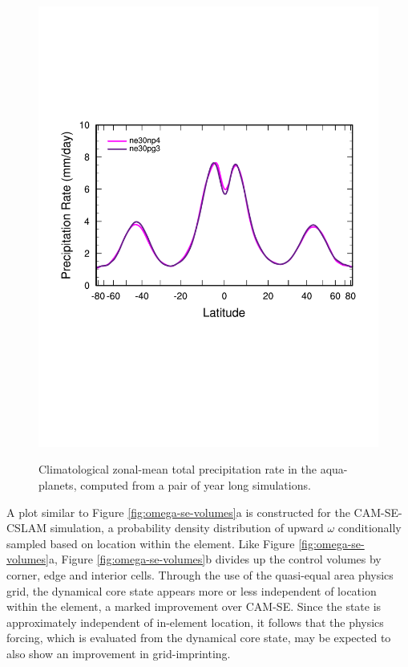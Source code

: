 \documentclass[twocol]{ametsoc}
\begin{document}
\begin{figure}[t]
\begin{center}
\noindent\includegraphics[width=37pc,angle=0]{figs/temp_dzonal.pdf}\\
\end{center}
\caption{Climatological zonal-mean total precipitation rate in the aqua-planets, computed from a pair of year long simulations.}
\label{fig:zonal}
\end{figure}

A plot similar to Figure \ref{fig:omega-se-volumes}a is constructed for the CAM-SE-CSLAM simulation, a probability density distribution of upward $\omega$ conditionally sampled based on location within the element. {\color{red}Like Figure \ref{fig:omega-se-volumes}a, Figure \ref{fig:omega-se-volumes}b divides up the control volumes by corner, edge and interior cells. Through the use of the quasi-equal area physics grid, the dynamical core state appears more or less independent of location within the element, a marked improvement over CAM-SE. Since the state is approximately independent of in-element location, it follows that the physics forcing, which is evaluated from the dynamical core state, may be expected to also show an improvement in grid-imprinting.{}} 
\end{document}
